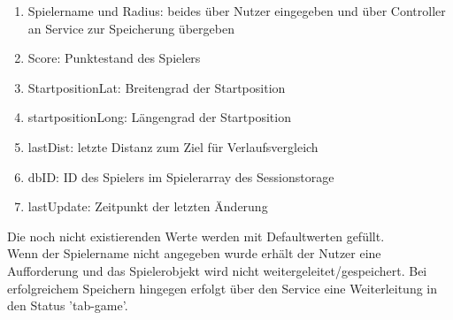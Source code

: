 \begin{enumerate}
\item Spielername und Radius: beides über Nutzer eingegeben und über Controller an Service zur Speicherung übergeben
\item Score: Punktestand des Spielers
\item StartpositionLat: Breitengrad der Startposition
\item startpositionLong: Längengrad der Startposition
\item lastDist: letzte Distanz zum Ziel für Verlaufsvergleich
\item dbID: ID des Spielers im Spielerarray des Sessionstorage
\item lastUpdate: Zeitpunkt der letzten Änderung
\end{enumerate}
Die noch nicht existierenden Werte werden mit Defaultwerten gefüllt.
\\
Wenn der Spielername nicht angegeben wurde erhält der Nutzer eine Aufforderung und das Spielerobjekt wird nicht weitergeleitet/gespeichert. Bei erfolgreichem Speichern hingegen erfolgt über den Service eine Weiterleitung in den Status 'tab-game'.

